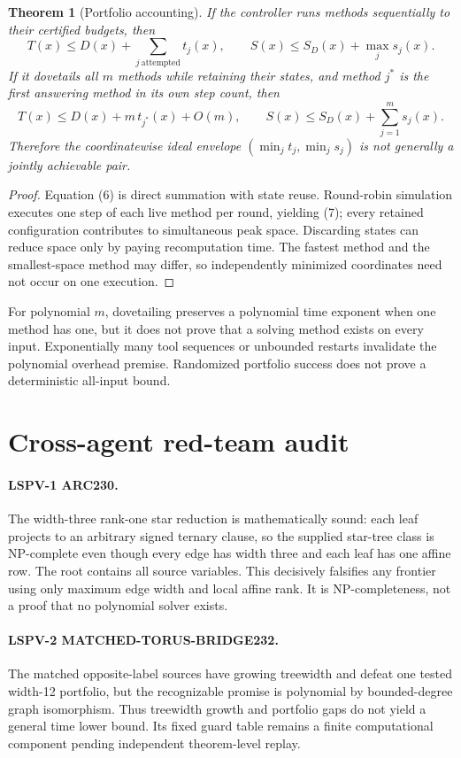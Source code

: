 \documentclass[11pt]{article}
\newtheorem{theorem}{Theorem}
\begin{document}
\begin{theorem}[Portfolio accounting]
If the controller runs methods sequentially to their certified budgets, then
\[
 T(x)\le D(x)+\sum_{j\ \mathrm{attempted}}t_j(x),\qquad
 S(x)\le S_D(x)+\max_j s_j(x). \tag{6}
\]
If it dovetails all $m$ methods while retaining their states, and method $j^*$
is the first answering method in its own step count, then
\[
 T(x)\le D(x)+m\,t_{j^*}(x)+O(m),\qquad
 S(x)\le S_D(x)+\sum_{j=1}^m s_j(x). \tag{7}
\]
Therefore the coordinatewise ideal envelope
$(\min_j t_j,\min_j s_j)$ is not generally a jointly achievable pair.
\end{theorem}
\begin{proof}
Equation (6) is direct summation with state reuse.  Round-robin simulation
executes one step of each live method per round, yielding (7); every retained
configuration contributes to simultaneous peak space.  Discarding states can
reduce space only by paying recomputation time.  The fastest method and the
smallest-space method may differ, so independently minimized coordinates need
not occur on one execution.
\end{proof}

For polynomial $m$, dovetailing preserves a polynomial time exponent when one
method has one, but it does not prove that a solving method exists on every
input.  Exponentially many tool sequences or unbounded restarts invalidate the
polynomial overhead premise.  Randomized portfolio success does not prove a
deterministic all-input bound.

\section{Cross-agent red-team audit}
\paragraph{LSPV-1 ARC230.}
The width-three rank-one star reduction is mathematically sound: each leaf
projects to an arbitrary signed ternary clause, so the supplied star-tree
class is NP-complete even though every edge has width three and each leaf has
one affine row.  The root contains all source variables.  This decisively
falsifies any frontier using only maximum edge width and local affine rank.
It is NP-completeness, not a proof that no polynomial solver exists.

\paragraph{LSPV-2 MATCHED-TORUS-BRIDGE232.}
The matched opposite-label sources have growing treewidth and defeat one
tested width-12 portfolio, but the recognizable promise is polynomial by
bounded-degree graph isomorphism.  Thus treewidth growth and portfolio gaps do
not yield a general time lower bound.  Its fixed guard table remains a finite
computational component pending independent theorem-level replay.
\end{document}
